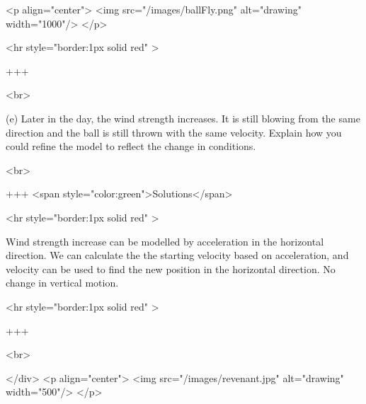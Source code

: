 <p align="center">
<img src="/images/ballFly.png" alt="drawing" width="1000"/>
</p>

<hr style="border:1px solid red" >

+++

<br>

(e) Later in the day, the wind strength increases. It is still blowing from the same direction and the ball is still thrown with the same velocity. Explain how you could refine the model to reflect the change in conditions.

<br>

+++ <span style="color:green">Solutions</span>

<hr style="border:1px solid red" >

Wind strength increase can be modelled by acceleration in the horizontal direction. We can calculate the the starting velocity based on acceleration, and velocity can be used to find the new position in the horizontal direction. 
No change in vertical motion.

<hr style="border:1px solid red" >

+++

<br>

</div>
<p align="center">
<img src="/images/revenant.jpg" alt="drawing" width="500"/>
</p>

